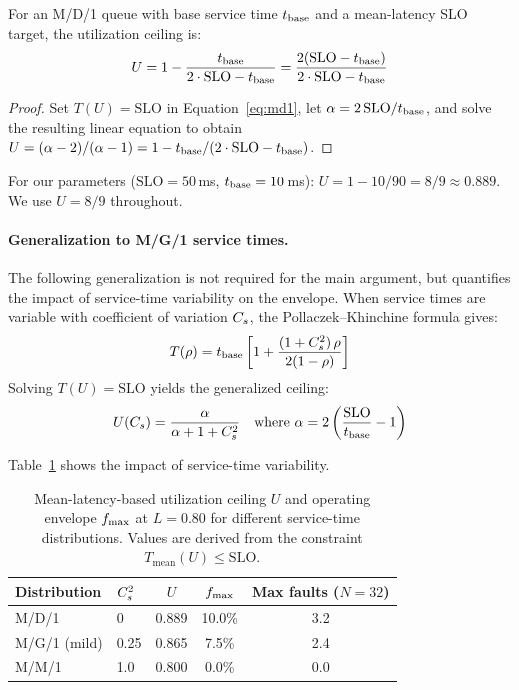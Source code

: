 \begin{corollary}
\label{cor:U}
For an M/D/1 queue with base service time $t_{\text{base}}$ and a mean-latency
SLO target, the utilization ceiling is:
\begin{equation}
  U = 1 - \frac{t_{\text{base}}}{2 \cdot \text{SLO} - t_{\text{base}}}
    = \frac{2(\text{SLO} - t_{\text{base}})}{2 \cdot \text{SLO} - t_{\text{base}}}
  \label{eq:U}
\end{equation}
\end{corollary}

\begin{proof}
Set $T(U) = \text{SLO}$ in Equation~\ref{eq:md1},
let $\alpha = 2\,\text{SLO}/t_{\text{base}}$, and solve the resulting linear
equation to obtain
$U = (\alpha - 2)/(\alpha - 1) = 1 - t_{\text{base}}/(2 \cdot \text{SLO} - t_{\text{base}})$.
\end{proof}

For our parameters ($\text{SLO} = 50$\,ms, $t_{\text{base}} = 10$\,ms):
$U = 1 - 10/90 = 8/9 \approx 0.889$. We use $U = 8/9$ throughout.

\medskip

\paragraph{Generalization to M/G/1 service times.}
The following generalization is not required for the main argument,
but quantifies the impact of service-time variability on the envelope.
When service times are variable with coefficient of variation $C_s$,
the Pollaczek--Khinchine formula gives:
\begin{equation}
  T(\rho) = t_{\text{base}} \left[1 + \frac{(1 + C_s^2)\,\rho}{2(1-\rho)}\right]
  \label{eq:mg1}
\end{equation}
Solving $T(U) = \text{SLO}$ yields the generalized ceiling:
\begin{equation}
  U(C_s) = \frac{\alpha}{\alpha + 1 + C_s^2}
  \quad\text{where } \alpha = 2\left(\frac{\text{SLO}}{t_{\text{base}}} - 1\right)
  \label{eq:U_mg1}
\end{equation}

Table~\ref{tab:Ucv} shows the impact of service-time variability.

\begin{table}[t]
\centering
\caption{Mean-latency-based utilization ceiling $U$ and operating
  envelope $f_{\max}$ at $L = 0.80$ for different service-time
  distributions. Values are derived from the constraint
  $T_{\text{mean}}(U) \leq \text{SLO}$.}
\label{tab:Ucv}
\begin{tabular}{@{}llccc@{}}
\toprule
Distribution & $C_s^2$ & $U$ & $f_{\max}$ & Max faults ($N{=}32$) \\
\midrule
M/D/1 & 0 & 0.889 & 10.0\% & 3.2 \\
M/G/1 (mild) & 0.25 & 0.865 & 7.5\% & 2.4 \\
M/M/1 & 1.0 & 0.800 & 0.0\% & 0.0 \\
\bottomrule
\end{tabular}
\end{table}

